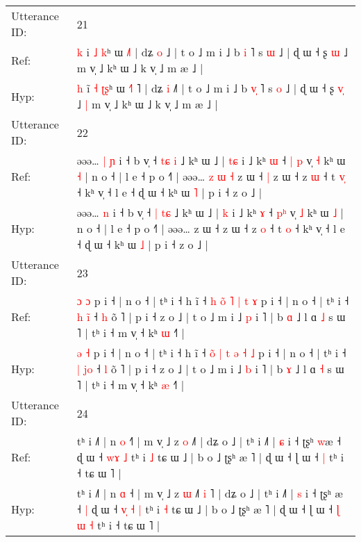 \documentclass[10pt]{article}
\DeclareRobustCommand{\hl}[1]{{\textcolor{red}{#1}}}
\begin{document}
\begin{longtable}{ll}
\midrule
Utterance ID: & 21 \\
Ref: & \hl{k} i\hl{} \hl{˩} \hl{}\hl{k}ʰ ɯ \hl{}\hl{}\hl{˩}˥ | dʑ \hl{o} ˩\hl{} | t o ˩ m i ˩ b \hl{}\hl{i} ˥ s \hl{ɯ} ˩ | ɖ ɯ ˧ ʂ \hl{}\hl{ɯ} ˩\hl{}\hl{} m v̩ ˩ kʰ ɯ ˩ k v̩ ˩ m æ ˩ |
 \\
Hyp: & \hl{h} i\hl{̃} \hl{˧} \hl{ʈ}\hl{ʂ}ʰ ɯ \hl{˧}\hl{˥}\hl{ }˥ | dʑ \hl{i} ˩\hl{˥} | t o ˩ m i ˩ b \hl{v}\hl{̩} ˥ s \hl{o} ˩ | ɖ ɯ ˧ ʂ \hl{v}\hl{̩} ˩\hl{ }\hl{|} m v̩ ˩ kʰ ɯ ˩ k v̩ ˩ m æ ˩ |
 \\
\midrule
Utterance ID: & 22 \\
Ref: & əəə…\hl{ }\hl{|} \hl{ɲ} i ˧ b v̩ ˧ \hl{t}\hl{ɕ}\hl{ }\hl{i} ˩ kʰ ɯ ˩ | \hl{t}\hl{ɕ} i ˩ kʰ \hl{ɯ} ˧ \hl{|}\hl{ }\hl{p} v̩ \hl{˧} kʰ ɯ \hl{˧} | n o ˧ | l e ˧ p o ˧˥ | əəə…\hl{ }\hl{z}\hl{ }\hl{ɯ}\hl{ }\hl{˧} z ɯ ˧\hl{ }\hl{|} z ɯ ˧ z \hl{ɯ} ˧ t \hl{v}\hl{̩} ˧ kʰ v̩ ˧ l e ˧ ɖ ɯ ˧ kʰ ɯ \hl{˥} | p i ˧ z o ˩ |
 \\
Hyp: & əəə…\hl{}\hl{} \hl{n} i ˧ b v̩ ˧ \hl{|}\hl{ }\hl{t}\hl{ɕ} ˩ kʰ ɯ ˩ | \hl{}\hl{k} i ˩ kʰ \hl{ɤ} ˧ \hl{}\hl{p}\hl{ʰ} v̩ \hl{˩} kʰ ɯ \hl{˩} | n o ˧ | l e ˧ p o ˧˥ | əəə…\hl{}\hl{}\hl{}\hl{}\hl{}\hl{} z ɯ ˧\hl{}\hl{} z ɯ ˧ z \hl{o} ˧ t \hl{}\hl{o} ˧ kʰ v̩ ˧ l e ˧ ɖ ɯ ˧ kʰ ɯ \hl{˩} | p i ˧ z o ˩ |
 \\
\midrule
Utterance ID: & 23 \\
Ref: & \hl{ɔ} \hl{ɔ} p i ˧ | n o ˧ | tʰ i ˧ h ĩ ˧ \hl{h}\hl{ }\hl{o}\hl{̃} \hl{˥} \hl{|} \hl{t} \hl{ɤ} p i ˧ | n o ˧ | tʰ i ˧ \hl{h} \hl{i}\hl{̃} ˧ \hl{h} õ ˥ | p i ˧ z o ˩ | t o ˩ m i ˩ \hl{p} i ˥ | b \hl{ɑ} ˩ l ɑ \hl{˩} s ɯ ˥ | tʰ i ˧ m v̩ ˧ kʰ \hl{ɯ} ˧˥ |
 \\
Hyp: & \hl{ə} \hl{˧} p i ˧ | n o ˧ | tʰ i ˧ h ĩ ˧ \hl{o}\hl{̃}\hl{ }\hl{|} \hl{t} \hl{ə} \hl{˧} \hl{˩} p i ˧ | n o ˧ | tʰ i ˧ \hl{|} \hl{j}\hl{o} ˧ \hl{l} õ ˥ | p i ˧ z o ˩ | t o ˩ m i ˩ \hl{b} i ˥ | b \hl{ɤ} ˩ l ɑ \hl{˧} s ɯ ˥ | tʰ i ˧ m v̩ ˧ kʰ \hl{æ} ˧˥ |
 \\
\midrule
Utterance ID: & 24 \\
Ref: & tʰ i ˩˥ | n \hl{o} ˧\hl{˥} | m v̩ ˩ z \hl{o} ˩\hl{}\hl{}\hl{}\hl{}˥ | dʑ o ˩ | tʰ i ˩˥ | \hl{ɕ} i ˧ ʈʂʰ \hl{w}æ ˧\hl{}\hl{} ɖ ɯ ˧ \hl{}\hl{}\hl{w}\hl{ɤ} \hl{˩} tʰ i \hl{˩} tɕ ɯ ˩ | b o ˩ ʈʂʰ æ ˥ | ɖ ɯ ˧ ɭ ɯ ˧\hl{}\hl{}\hl{}\hl{} \hl{|} tʰ i ˧ tɕ ɯ ˥ |
 \\
Hyp: & tʰ i ˩˥ | n \hl{ɑ} ˧\hl{} | m v̩ ˩ z \hl{ɯ} ˩\hl{˥}\hl{ }\hl{i}\hl{ }˥ | dʑ o ˩ | tʰ i ˩˥ | \hl{s} i ˧ ʈʂʰ \hl{}æ ˧\hl{ }\hl{|} ɖ ɯ ˧ \hl{v}\hl{̩}\hl{ }\hl{˧} \hl{|} tʰ i \hl{˧} tɕ ɯ ˩ | b o ˩ ʈʂʰ æ ˥ | ɖ ɯ ˧ ɭ ɯ ˧\hl{ }\hl{ɭ}\hl{ }\hl{ɯ} \hl{˧} tʰ i ˧ tɕ ɯ ˥ |

\end{longtable}
\end{document}
